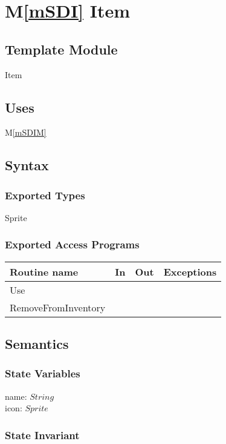 \documentclass[12pt]{article}
\newcommand{\mref}[1]{M\ref{#1}}
\begin{document}
\section* {\mref{mSDI} Item}

\subsection*{Template Module}

Item

\subsection* {Uses}

\mref{mSDIM}

\subsection* {Syntax}

\subsubsection* {Exported Types}

Sprite

\subsubsection* {Exported Access Programs}

\begin{tabular}{| l | l | l | l |}
\hline
\textbf{Routine name} & \textbf{In} & \textbf{Out} & \textbf{Exceptions}\\
\hline
Use & ~ & ~ & ~\\
\hline
RemoveFromInventory & ~ & ~ & ~\\
\hline
\end{tabular}

\subsection* {Semantics}

\subsubsection* {State Variables}

name: $String$\\
icon: $Sprite$

\subsubsection* {State Invariant}
\end{document}
